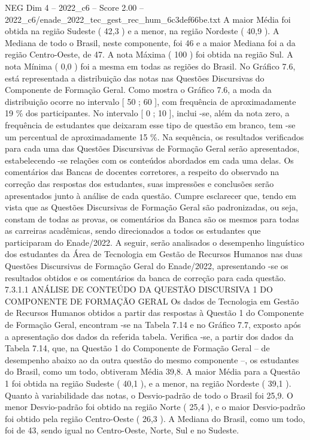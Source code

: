\begin{textsample}{NEG Dim 4 – 2022\_c6 – Score 2.00 – 2022\_c6/enade\_2022\_tec\_gest\_rec\_hum\_6c3def66be.txt}
A maior Média foi obtida na região Sudeste ( 42,3 ) e a menor, na região Nordeste ( 40,9 ).
A Mediana de todo o Brasil, neste componente, foi 46 e a maior Mediana foi a da região Centro-Oeste, de 47.
A nota Máxima ( 100 ) foi obtida na região Sul.
A nota Mínima ( 0,0 ) foi a mesma em todas as regiões do Brasil.
No Gráfico 7.6, está representada a distribuição das notas nas Questões Discursivas do Componente de Formação Geral.
Como mostra o Gráfico 7.6, a moda da distribuição ocorre no intervalo [ 50 ; 60 ], com frequência de aproximadamente 19 \% dos participantes.
No intervalo [ 0 ; 10 ], inclui -se, além da nota zero, a frequência de estudantes que deixaram esse tipo de questão em branco, tem -se um percentual de aproximadamente 15 \%.
Na sequência, os resultados verificados para cada uma das Questões Discursivas de Formação Geral serão apresentados, estabelecendo -se relações com os conteúdos abordados em cada uma delas.
Os comentários das Bancas de docentes corretores, a respeito do observado na correção das respostas dos estudantes, suas impressões e conclusões serão apresentados junto à análise de cada questão.
Cumpre esclarecer que, tendo em vista que as Questões Discursivas de Formação Geral são padronizadas, ou seja, constam de todas as provas, os comentários da Banca são os mesmos para todas as carreiras acadêmicas, sendo direcionados a todos os estudantes que participaram do Enade/2022.
A seguir, serão analisados o desempenho linguístico dos estudantes da Área de Tecnologia em Gestão de Recursos Humanos nas duas Questões Discursivas de Formação Geral do Enade/2022, apresentando -se os resultados obtidos e os comentários da banca de correção para cada questão. 7.3.1.1 ANÁLISE DE CONTEÚDO DA QUESTÃO DISCURSIVA 1 DO COMPONENTE DE FORMAÇÃO GERAL Os dados de Tecnologia em Gestão de Recursos Humanos obtidos a partir das respostas à Questão 1 do Componente de Formação Geral, encontram -se na Tabela 7.14 e no Gráfico 7.7, exposto após a apresentação dos dados da referida tabela.
Verifica -se, a partir dos dados da Tabela 7.14, que, na Questão 1 do Componente de Formação Geral – de desempenho abaixo ao da outra questão do mesmo componente –, os estudantes do Brasil, como um todo, obtiveram Média 39,8.
A maior Média para a Questão 1 foi obtida na região Sudeste ( 40,1 ), e a menor, na região Nordeste ( 39,1 ).
Quanto à variabilidade das notas, o Desvio-padrão de todo o Brasil foi 25,9.
O menor Desvio-padrão foi obtido na região Norte ( 25,4 ), e o maior Desvio-padrão foi obtido pela região Centro-Oeste ( 26,3 ).
A Mediana do Brasil, como um todo, foi de 43, sendo igual no Centro-Oeste, Norte, Sul e no Sudeste.

\end{textsample}
